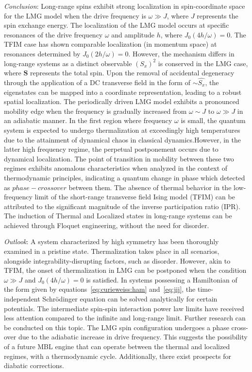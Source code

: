 \documentclass[%
reprint,
superscriptaddress,
amsmath,amssymb,
aps,
prb,
showkeys,
]{revtex4-2}
\begin{document}
	\emph{Conclusion}: Long-range spins exhibit strong localization in spin-coordinate space for the LMG model when the drive frequency is $\omega \gg J$, where $J$ represents the spin exchange energy. The localization of the LMG model occurs at specific resonances of the drive frequency $\omega$ and amplitude $h$, where $J_0(4h/\omega)=0$. The TFIM case has shown comparable localization (in momentum space) at resonances determined by $J_0(2h/\omega)=0$. However, the mechanism differs in long-range systems as a distinct observable $(S_x)^2$ is conserved in the LMG case, where $\mathbf{S}$ represents the total spin. Upon the removal of accidental degeneracy through the application of a DC transverse field in the form of $\sim \hat{S_x}$, the eigenstates can be mapped into a coordinate representation, leading to a robust spatial localization. The periodically driven LMG model exhibits a pronounced mobility edge when the frequency is gradually increased from $\omega \sim J$ to $\omega \gg J$ in an adiabatic manner. In the first region where frequency $\omega$ is small, the quantum system is expected to undergo thermalization at exceedingly high temperatures due to the attainment of dynamical chaos in classical dynamics.However, in the latter high frequency regime, the perpetual postponement occurs due to dynamical localization. The point of transition in mobility between these two regimes exhibits anomalous characteristics when analyzed in the context of thermodynamic principles, indicating a quantum change in phase which detected as $phase-crossover$ between them. The absence of thermal behavior in the low-frequency limit of the short-range transverse field Ising model (TFIM) can be attributed to the significant magnitude of the inverse participation ratio (IPR). The induction of Thermal and Localized states in long-range systems can be achieved through Floquet engineering, without the need for disorder.	
	
	\emph{Outlook}: 	
	A system characterized by high symmetry has been thoroughly examined in a pristine state. Thermalization takes place in all scenarios, alongside integrability-disrupting factors, such as disorder. However, akin to TFIM, the onset of thermalization in LMG can be postponed when the condition $\omega\gg J$ and $J_0(4h/\omega) = 0$ is satisfied. In systems possessing a Hamiltonian of the form given by equations~\ref{eq:curieweiss:ham} and~\ref{eq:jij}, the time-independent Schrödinger equation can be solved analytically for certain potentials. The intermediate spin-spin interaction power law limits have received less attention compared to the infinite and long-range limit. Further research can be conducted on this topic. The LMG spin configuration undergoes a phase cross-over due to the adiabatic increase in drive frequency. This suggests the possibility of a future MBL engine that can operate between the thermal and localized regimes, with a thermodynamic cycle. Additionally, there exist prospects for diabatic corrections. 
	
\end{document}

